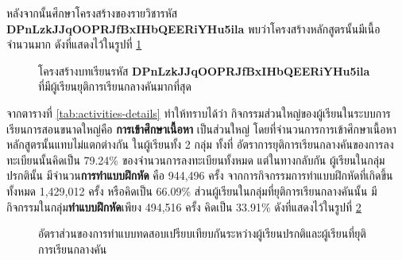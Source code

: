 \documentclass[conference]{IEEEtran}
\def\moocs{การเรียนการสอนขนาดใหญ่}
\def\MOOCs{ระบบ{\moocs}}
\def\dropout{ยุติการเรียนกลางคัน}
\begin{document}
    หลังจากนั้นศึกษาโครงสร้างของรายวิชารหัส \textbf{DPnLzkJJqOOPRJfBxIHbQEERiYHu5ila}
    พบว่าโครงสร้างหลักสูตรนั้นมีเนื้อจำนวนมาก ดังที่แสดงไว้ในรูปที่ \ref{fig:most-dropout-course}

    \begin{figure}[htbp]
        \caption{โครงสร้างบทเรียนรหัส \textbf{DPnLzkJJqOOPRJfBxIHbQEERiYHu5ila} ที่มีผู้เรียน{\dropout}มากที่สุด}
        \label{fig:most-dropout-course}
    \end{figure}


    จากตารางที่ \ref{tab:activities-details} ทำให้ทราบได้ว่า
    กิจกรรมส่วนใหญ่ของผู้เรียนใน{\MOOCs}คือ {\textbf{การเข้าศึกษาเนื้อหา}} เป็นส่วนใหญ่
    โดยที่จำนวนการการเข้าศึกษาเนื้อหาหลักสูตรนั้นแทบไม่แตกต่างกัน ในผู้เรียนทั้ง 2 กลุ่ม 
    ทั้งที่ อัตราการ{\dropout}ของการลงทะเบียนนั้นคิดเป็น 79.24\% ของจำนวนการลงทะเบียนทั้งหมด
    แต่ในทางกลับกัน ผู้เรียนในกลุ่มปรกตินั้น มีจำนวน{\textbf{การทำแบบฝึกหัด}} คือ 944,496 ครั้ง 
    จากการกิจกรรมการทำแบบฝึกหัดที่เกิดขึ้นทั้งหมด 1,429,012 ครั้ง หรือคิดเป็น 66.09\% 
    ส่วนผู้เรียนในกลุ่มที่{\dropout}นั้น มีกิจกรรมในกลุ่ม{\textbf{ทำแบบฝึกหัด}}เพียง 494,516 ครั้ง 
    คิดเป็น 33.91\% ดังที่แสดงไว้ในรูปที่ \ref{fig:problem-norm-dropout}

    \begin{figure}[ht!]
        \caption{อัตราส่วนของการทำแบบทดสอบเปรียบเทียบกันระหว่างผู้เรียนปรกติและผู้เรียนที่{\dropout}}
        \label{fig:problem-norm-dropout}
    \end{figure}
\end{document}
